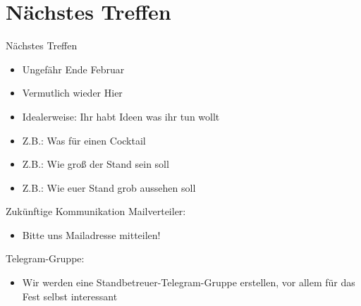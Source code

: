 \section{Nächstes Treffen}

\begin{frame}[c]{Nächstes Treffen}
    \begin{itemize}[<+(1)->]
        \item Ungefähr Ende Februar
        \item Vermutlich wieder Hier
        \item Idealerweise: Ihr habt Ideen was ihr tun wollt
        \item Z.B.: Was für einen Cocktail
        \item Z.B.: Wie groß der Stand sein soll
        \item Z.B.: Wie euer Stand grob aussehen soll
    \end{itemize}
\end{frame}


\begin{frame}[c]{Zukünftige Kommunikation}
    Mailverteiler:
     \begin{itemize}[<+(1)->]
         \item Bitte uns Mailadresse mitteilen!
     \end{itemize}

     \pause
     Telegram-Gruppe:
    \begin{itemize}[<+(1)->]
        \item Wir werden eine Standbetreuer-Telegram-Gruppe erstellen, vor allem für das Fest selbst interessant
    \end{itemize}
\end{frame}



